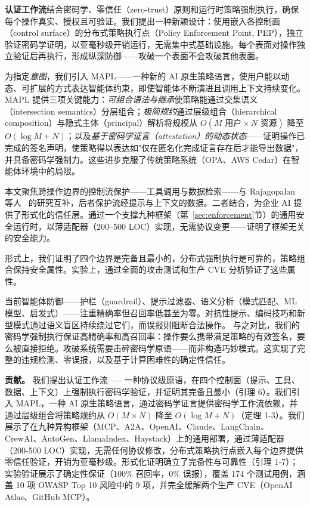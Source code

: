 \textbf{认证工作流}结合密码学、零信任（zero-trust）原则和运行时策略强制执行，确保每个操作真实、授权且可验证。我们提出一种新颖设计：使用嵌入各控制面（control surface）的分布式策略执行点（Policy Enforcement Point, PEP），独立验证密码学证明，以亚毫秒级开销运行，无需集中式基础设施。每个表面对操作独立验证后再执行，形成纵深防御——攻破一个表面不会攻破其他表面。

为指定\textit{意图}，我们引入 MAPL——一种新的 AI 原生策略语言，使用户能以动态、可扩展的方式表达智能体约束，即使智能体不断演进且调用上下文持续变化。MAPL 提供三项关键能力：\textit{可组合语法与继承}使策略能通过交集语义（intersection semantics）分层组合；\textit{极简规约}通过层级组合（hierarchical composition）与隐式主体（principal）解析将规模从 $O(M \text{ 用户} \times N \text{ 资源})$ 降至 $O(\log M + N)$；以及\textit{基于密码学证言（attestation）的动态状态}——证明操作已完成的签名声明，使策略得以表达如"仅在匿名化完成证言存在后才能导出数据"，并具备密码学强制力。这些进步克服了传统策略系统（OPA、AWS Cedar）在智能体环境中的局限。

本文聚焦跨操作边界的控制流保护——工具调用与数据检索——与 Rajagopalan 等人~\cite{rajagopalan2025prompts} 的研究互补，后者保护流经提示与上下文的数据。二者结合，为企业 AI 提供了形式化的信任层。通过一个支撑九种框架（第~\ref{sec:enforcement}节）的通用安全运行时，以薄适配器（200–500 LOC）实现，无需协议变更——证明了框架无关的安全能力。

形式上，我们证明了四个边界是完备且最小的，分布式强制执行是可靠的，策略组合保持安全属性。实验上，通过全面的攻击测试和生产 CVE 分析验证了这些属性。

当前智能体防御——护栏（guardrail）、提示过滤器、语义分析（模式匹配、ML 模型、启发式）——注重精确率但召回率低甚至为零。对抗性提示、编码技巧和新型模式通过语义盲区持续绕过它们，而误报则阻断合法操作。
与之对比，我们的密码学强制执行保证高精确率和高召回率：操作要么携带满足策略的有效签名，要么被直接拒绝。攻破系统需要击碎密码学原语——而非构造巧妙模式。这实现了完整的违规检测、零误报，以及基于计算困难性的确定性信任。


\noindent\textbf{贡献。}
我们提出认证工作流——一种协议级原语，在四个控制面（提示、工具、数据、上下文）上强制执行密码学验证，并证明其完备且最小（引理 6）。我们引入 MAPL，一种 AI 原生策略语言，通过密码学证言提供密码学工作流依赖，并通过层级组合将策略规约从 $O(M \times N)$ 降至 $O(\log M + N)$（定理 1-3）。我们展示了在九种异构框架（MCP、A2A、OpenAI、Claude、LangChain、CrewAI、AutoGen、LlamaIndex、Haystack）上的通用部署，通过薄适配器（200-500 LOC）实现，无需任何协议修改，分布式策略执行点嵌入每个边界提供零信任验证，开销为亚毫秒级。形式化证明确立了完备性与可靠性（引理 1-7）；实验验证展示了确定性保证（100\% 召回率，0\% 误报），覆盖 174 个测试用例，涵盖 10 项 OWASP Top 10 风险中的 9 项，并完全缓解两个生产 CVE（OpenAI Atlas、GitHub MCP）。
